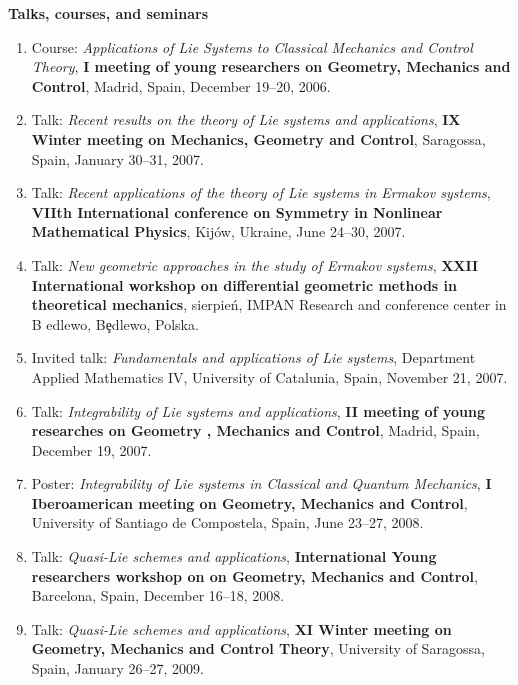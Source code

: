 \documentclass[12pt,reqno]{amsbook}
\begin{document}
{\bf Talks, courses, and seminars}

\begin{enumerate}
        \item Course: {\it Applications of Lie Systems to Classical Mechanics and Control Theory}, {\bf I meeting of young researchers on Geometry, Mechanics and Control}, Madrid, Spain,  December 19--20, 2006.
        
        \item Talk: {\it Recent results on the theory of Lie systems and applications}, {\bf IX Winter meeting on Mechanics, Geometry and Control}, Saragossa, Spain,  January 30--31, 2007.
        
        \item Talk: {\it Recent applications of the theory of Lie systems in Ermakov systems},
        {\bf VIIth International conference on Symmetry in Nonlinear Mathematical Physics}, Kij\'ow, Ukraine, June 24--30, 2007.
        
        \item Talk: {\it New geometric approaches in the study of Ermakov systems}, {\bf  XXII International workshop on differential geometric methods in theoretical mechanics}, sierpie\'n, IMPAN Research and conference center in B edlewo,  B\c edlewo, Polska.
        
        \item  Invited talk: {\it Fundamentals and applications of Lie systems}, Department Applied Mathematics IV, University of Catalunia, Spain, November  21, 2007.
        
        \item Talk:  {\it Integrability of Lie systems and applications}, {\bf II meeting of young researches on Geometry , Mechanics and Control}, Madrid, Spain, December 19, 2007.
        
        \item Poster: {\it  Integrability of Lie systems in Classical and Quantum Mechanics}, {\bf I Iberoamerican meeting on Geometry, Mechanics and Control}, University of Santiago de Compostela, Spain, June 23--27, 2008.
        
        \item Talk:  {\it Quasi-Lie schemes and applications}, {\bf International Young researchers workshop on on Geometry, Mechanics and Control}, Barcelona, Spain, December 16--18, 2008.
        
        \item Talk:  {\it Quasi-Lie schemes and applications}, {\bf XI Winter meeting on Geometry, Mechanics and Control Theory},  University of Saragossa, Spain, January 26--27, 2009.
        

\end{enumerate}
\end{document}
